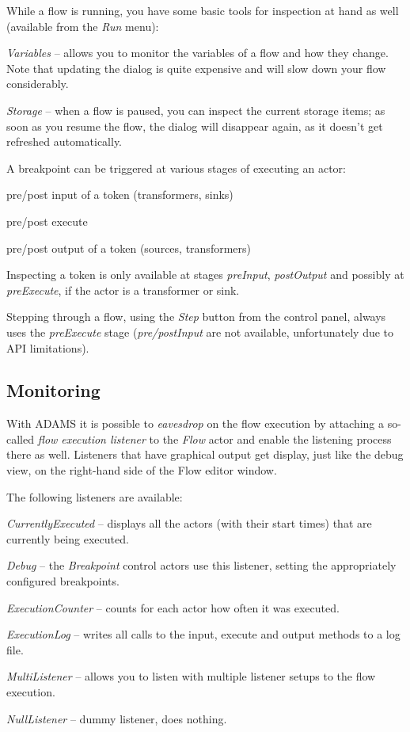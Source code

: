 While a flow is running, you have some basic tools for inspection at hand as
well (available from the \textit{Run} menu):
\begin{tight_itemize}
	\item \textit{Variables} -- allows you to monitor the variables of a flow
	and how they change. Note that updating the dialog is quite expensive and
	will slow down your flow considerably.
	\item \textit{Storage} -- when a flow is paused, you can inspect the
	current storage items; as soon as you resume the flow, the dialog will
	disappear again, as it doesn't get refreshed automatically.
\end{tight_itemize}
A breakpoint can be triggered at various stages of executing an actor:
\begin{tight_itemize}
  \item pre/post input of a token (transformers, sinks)
  \item pre/post execute
  \item pre/post output of a token (sources, transformers)
\end{tight_itemize}
Inspecting a token is only available at stages \textit{preInput},
\textit{postOutput} and possibly at \textit{preExecute}, if the
actor is a transformer or sink.

Stepping through a flow, using the \textit{Step} button 
from the control panel, always uses the \textit{preExecute} stage (\textit{pre/postInput}
are not available, unfortunately due to API limitations).

\subsection{Monitoring}
With ADAMS it is possible to \textit{eavesdrop} on the flow execution by
attaching a so-called \textit{flow execution listener} to the \textit{Flow}
actor and enable the listening process there as well. Listeners that have
graphical output get display, just like the debug view, on the right-hand
side of the Flow editor window.

The following listeners are available:
\begin{tight_itemize}
	\item \textit{CurrentlyExecuted} -- displays all the actors (with their
	start times) that are currently being executed.
	\item \textit{Debug} -- the \textit{Breakpoint} control actors use
	this listener, setting the appropriately configured breakpoints.
	\item \textit{ExecutionCounter} -- counts for each actor how often it was
	executed.
	\item \textit{ExecutionLog} -- writes all calls to the input, execute
	and output methods to a log file.
	\item \textit{MultiListener} -- allows you to listen with multiple
	listener setups to the flow execution.
	\item \textit{NullListener} -- dummy listener, does nothing.
\end{tight_itemize}



